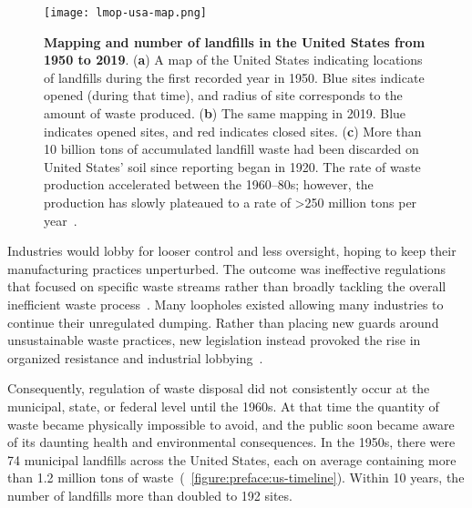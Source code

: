 \documentclass[../main/main]{subfiles}
\begin{document}
\begin{figure}[H]
	\centering
	\texttt{[image: lmop-usa-map.png]}
	\caption[Mapping and number of landfills in the United States from 1950 to 2019]
	{
		\textbf{Mapping and number of landfills in the United States from 1950 to 2019}\protect\footnotemark.
		(\textbf{a}) A map of the United States indicating locations of landfills during the first recorded year in 1950. Blue sites indicate opened (during that time), and radius of site corresponds to the amount of waste produced.
		(\textbf{b}) The same mapping in 2019. Blue indicates opened sites, and red indicates closed sites.
		(\textbf{c}) More than 10 billion tons of accumulated landfill waste had been discarded on United States' soil since reporting began in 1920. The rate of waste production accelerated between the 1960--80s; however, the production has slowly plateaued to a rate of >250 million tons per year~\cite{usepa2017b}.
  }
  \label{figure:preface:lmop-usa-map}
\end{figure}

\noindent Industries would lobby for looser control and less oversight, hoping to keep their manufacturing practices unperturbed. The outcome was ineffective regulations that focused on specific waste streams rather than broadly tackling the overall inefficient waste process~\cite{markowitz2013}. Many loopholes existed allowing many industries to continue their unregulated dumping. Rather than placing new guards around unsustainable waste practices, new legislation instead provoked the rise in organized resistance and industrial lobbying~\cite{elliott2013,markowitz2013}.

Consequently, regulation of waste disposal did not consistently occur at the municipal, state, or federal level until the 1960s. At that time the quantity of waste became physically impossible to avoid, and the public soon became aware of its daunting health and environmental consequences. In the 1950s, there were 74 municipal landfills across the United States, each on average containing more than 1.2 million tons of waste~(\FIGURE~\ref{figure:preface:us-timeline}). Within 10 years, the number of landfills more than doubled to 192 sites.
\end{document}

